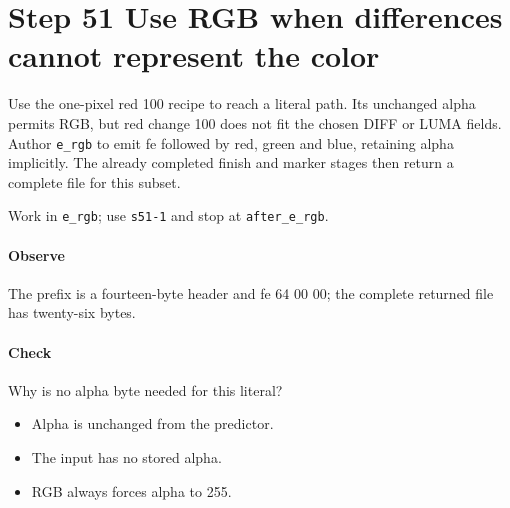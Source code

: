 \section{Step 51 Use RGB when differences cannot represent the color}\label{qoi-s51}
Use the one-pixel red 100 recipe to reach a literal path. Its unchanged alpha permits RGB, but red change 100 does not fit the chosen DIFF or LUMA fields. Author \texttt{e\_rgb} to emit fe followed by red, green and blue, retaining alpha implicitly. The already completed finish and marker stages then return a complete file for this subset.

Work in \texttt{e\_rgb}; use \texttt{s51-1} and stop at \texttt{after\_e\_rgb}.

\paragraph{Observe} The prefix is a fourteen-byte header and fe 64 00 00; the complete returned file has twenty-six bytes.

\paragraph{Check} Why is no alpha byte needed for this literal?
\begin{itemize}
\item[A.] Alpha is unchanged from the predictor.
\item[B.] The input has no stored alpha.
\item[C.] RGB always forces alpha to 255.
\end{itemize}
